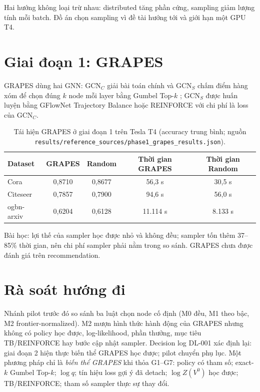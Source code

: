 \documentclass[11pt,a4paper,oneside]{report}
\begin{document}
Hai hướng không loại trừ nhau: distributed tăng phần cứng, sampling giảm lượng tính mỗi batch. Đồ án chọn sampling vì đề tài hướng tới và giới hạn một GPU T4.

\section{Giai đoạn 1: GRAPES}
GRAPES \cite{grapes} dùng hai GNN: $\mathrm{GCN}_C$ giải bài toán chính và $\mathrm{GCN}_S$ chấm điểm hàng xóm để chọn đúng $k$ node mỗi layer bằng Gumbel Top-$k$ \cite{gumbeltopk}; $\mathrm{GCN}_S$ được huấn luyện bằng GFlowNet Trajectory Balance \cite{tb} hoặc REINFORCE với chi phí là loss của $\mathrm{GCN}_C$.

\begin{table}[h]
\centering\small
\caption{Tái hiện GRAPES ở giai đoạn 1 trên Tesla T4 (accuracy trung bình; nguồn \texttt{results/reference\_sources/phase1\_grapes\_results.json}).}\label{tab:phase1}
\begin{tabular}{lcccc}
\toprule
Dataset & GRAPES & Random & Thời gian GRAPES & Thời gian Random \\
\midrule
Cora & 0,8710 & 0,8677 & 56,3 s & 30,5 s \\
Citeseer & 0,7857 & 0,7900 & 94,6 s & 56,0 s \\
ogbn-arxiv & 0,6204 & 0,6128 & 11.114 s & 8.133 s \\
\bottomrule
\end{tabular}
\end{table}
Bài học: lợi thế của sampler học được nhỏ và không đều; sampler tốn thêm 37--85\% thời gian, nên chi phí sampler phải nằm trong so sánh. GRAPES chưa được đánh giá trên recommendation.

\section{Rà soát hướng đi}
Nhánh pilot trước đó so sánh ba luật chọn node cố định (M0 đều, M1 theo bậc, M2 frontier-normalized). M2 mượn hình thức hành động của GRAPES nhưng không có policy học được, log-likelihood, phần thưởng, mục tiêu TB/REINFORCE hay bước cập nhật sampler. Decision log DL-001 xác định lại: giai đoạn 2 hiện thực biến thể GRAPES học được; pilot chuyển phụ lục. Một phương pháp chỉ là \emph{biến thể GRAPES} khi thỏa G1--G7: policy có tham số; exact-$k$ Gumbel Top-$k$; $\log q$; tín hiệu loss gợi ý đã detach; $\log Z(V^0)$ học được; TB/REINFORCE; tham số sampler thực sự thay đổi.
\end{document}
